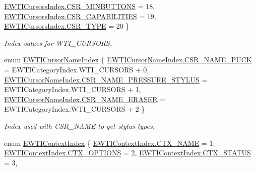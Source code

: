 \begin{DoxyCompactItemize}
\mbox{\hyperlink{namespace_wintab_d_n_a215ef64798be3e0207e5bbf438659d61ad08e54efaae57acbad904f7e5abf96ab}{E\+W\+T\+I\+Cursors\+Index.\+C\+S\+R\+\_\+\+M\+I\+N\+B\+U\+T\+T\+O\+NS}} = 18, 
\mbox{\hyperlink{namespace_wintab_d_n_a215ef64798be3e0207e5bbf438659d61a99af52f3e638ae50b5f16c6f67a16120}{E\+W\+T\+I\+Cursors\+Index.\+C\+S\+R\+\_\+\+C\+A\+P\+A\+B\+I\+L\+I\+T\+I\+ES}} = 19, 
\mbox{\hyperlink{namespace_wintab_d_n_a215ef64798be3e0207e5bbf438659d61a1c0737f8288fe2dd1ac3e7e8b1eff7e1}{E\+W\+T\+I\+Cursors\+Index.\+C\+S\+R\+\_\+\+T\+Y\+PE}} = 20
 \}
\begin{DoxyCompactList}\small\item\em Index values for W\+T\+I\+\_\+\+C\+U\+R\+S\+O\+RS. \end{DoxyCompactList}\item 
enum \mbox{\hyperlink{namespace_wintab_d_n_a54fdc0e52106effb073b35f8f6b3920a}{E\+W\+T\+I\+Cursor\+Name\+Index}} \{ \mbox{\hyperlink{namespace_wintab_d_n_a54fdc0e52106effb073b35f8f6b3920aac73b96dbefc213fba2efcb5cc9afd68b}{E\+W\+T\+I\+Cursor\+Name\+Index.\+C\+S\+R\+\_\+\+N\+A\+M\+E\+\_\+\+P\+U\+CK}} = E\+W\+T\+I\+Category\+Index.\+W\+T\+I\+\_\+\+C\+U\+R\+S\+O\+RS + 0, 
\mbox{\hyperlink{namespace_wintab_d_n_a54fdc0e52106effb073b35f8f6b3920aafdca87133e7f591ba6a72c4f92c960f2}{E\+W\+T\+I\+Cursor\+Name\+Index.\+C\+S\+R\+\_\+\+N\+A\+M\+E\+\_\+\+P\+R\+E\+S\+S\+U\+R\+E\+\_\+\+S\+T\+Y\+L\+US}} = E\+W\+T\+I\+Category\+Index.\+W\+T\+I\+\_\+\+C\+U\+R\+S\+O\+RS + 1, 
\mbox{\hyperlink{namespace_wintab_d_n_a54fdc0e52106effb073b35f8f6b3920aa34cde7b9ed3b19e48fc745bf6ef9c932}{E\+W\+T\+I\+Cursor\+Name\+Index.\+C\+S\+R\+\_\+\+N\+A\+M\+E\+\_\+\+E\+R\+A\+S\+ER}} = E\+W\+T\+I\+Category\+Index.\+W\+T\+I\+\_\+\+C\+U\+R\+S\+O\+RS + 2
 \}
\begin{DoxyCompactList}\small\item\em Index used with C\+S\+R\+\_\+\+N\+A\+ME to get stylus types. \end{DoxyCompactList}\item 
enum \mbox{\hyperlink{namespace_wintab_d_n_a75b4777047ea6ca407c8cd928ca9ef26}{E\+W\+T\+I\+Context\+Index}} \{ \newline
\mbox{\hyperlink{namespace_wintab_d_n_a75b4777047ea6ca407c8cd928ca9ef26a0abc03013052c76f444e85b56d6b63cc}{E\+W\+T\+I\+Context\+Index.\+C\+T\+X\+\_\+\+N\+A\+ME}} = 1, 
\mbox{\hyperlink{namespace_wintab_d_n_a75b4777047ea6ca407c8cd928ca9ef26a60edb117c33614b8c81ffab5d4ed508e}{E\+W\+T\+I\+Context\+Index.\+C\+T\+X\+\_\+\+O\+P\+T\+I\+O\+NS}} = 2, 
\mbox{\hyperlink{namespace_wintab_d_n_a75b4777047ea6ca407c8cd928ca9ef26a8cca36bceb7386c28221fc6ba8c76bac}{E\+W\+T\+I\+Context\+Index.\+C\+T\+X\+\_\+\+S\+T\+A\+T\+US}} = 3, 

\end{DoxyCompactItemize}
